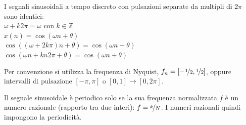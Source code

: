 I segnali sinusoidali a tempo discreto con pulsazioni separate da multipli di $2\pi$ sono identici: \\
$\omega + k2\pi = \omega$ con $k \in \mathbb{Z}$ \\
$x(n) = \cos(\omega n + \theta)$ \\
$\cos((\omega + 2k\pi)n + \theta) = \cos(\omega n + \theta)$ \\
$\cos(\omega n + kn2\pi + \theta) = \cos(\omega n + \theta)$

Per convenzione si utilizza la frequenza di Nyquist, $f_n = [-\nicefrac{1}{2}, \nicefrac{1}{2}]$, oppure intervalli di pulsazione $[-\pi, \pi]$ o $[0, 1] \rightarrow [0, 2\pi]$.

Il segnale sinusoidale è periodico solo se la sua frequenza normalizzata $f$ è un numero razionale (rapporto tra due interi): $f = \nicefrac{k}{N}$. I numeri razionali quindi impongono la periodicità. 
